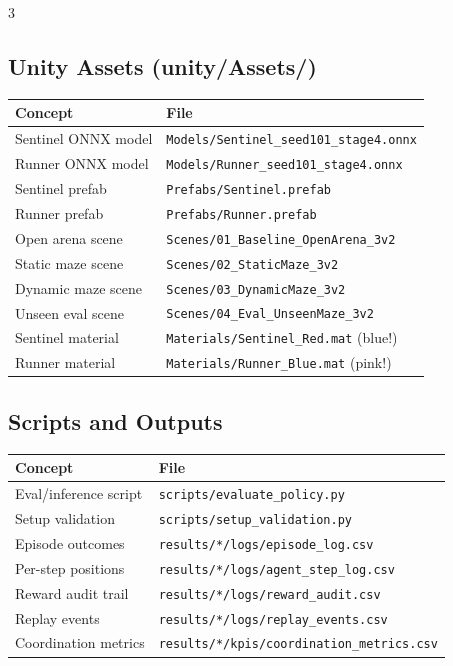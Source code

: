\documentclass[10pt,landscape,a4paper]{article}
\begin{document}
\begin{multicols}{3}
\subsection{Unity Assets (unity/Assets/)}
\begin{tabular}{@{}p{2.8cm}p{4.8cm}@{}}
\toprule
\textbf{Concept} & \textbf{File} \\
\midrule
Sentinel ONNX model & \texttt{Models/Sentinel\_seed101\_stage4.onnx} \\
Runner ONNX model & \texttt{Models/Runner\_seed101\_stage4.onnx} \\
Sentinel prefab & \texttt{Prefabs/Sentinel.prefab} \\
Runner prefab & \texttt{Prefabs/Runner.prefab} \\
Open arena scene & \texttt{Scenes/01\_Baseline\_OpenArena\_3v2} \\
Static maze scene & \texttt{Scenes/02\_StaticMaze\_3v2} \\
Dynamic maze scene & \texttt{Scenes/03\_DynamicMaze\_3v2} \\
Unseen eval scene & \texttt{Scenes/04\_Eval\_UnseenMaze\_3v2} \\
Sentinel material & \texttt{Materials/Sentinel\_Red.mat} {\tiny(blue!)} \\
Runner material & \texttt{Materials/Runner\_Blue.mat} {\tiny(pink!)} \\
\bottomrule
\end{tabular}

\subsection{Scripts and Outputs}
\begin{tabular}{@{}p{2.8cm}p{4.8cm}@{}}
\toprule
\textbf{Concept} & \textbf{File} \\
\midrule
Eval/inference script & \texttt{scripts/evaluate\_policy.py} \\
Setup validation & \texttt{scripts/setup\_validation.py} \\
Episode outcomes & \texttt{results/*/logs/episode\_log.csv} \\
Per-step positions & \texttt{results/*/logs/agent\_step\_log.csv} \\
Reward audit trail & \texttt{results/*/logs/reward\_audit.csv} \\
Replay events & \texttt{results/*/logs/replay\_events.csv} \\
Coordination metrics & \texttt{results/*/kpis/coordination\_metrics.csv} \\
\bottomrule
\end{tabular}


\end{multicols}
\end{document}
